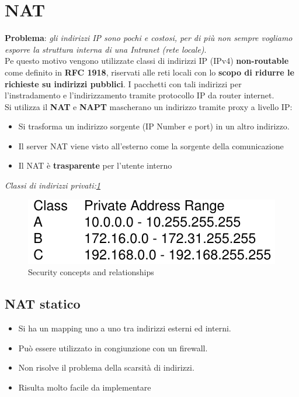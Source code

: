 \documentclass[12pt]{article}
\begin{document}
	\section{NAT}
		\textbf{Problema}: \textit{gli indirizzi IP sono pochi e costosi, per di più non sempre vogliamo esporre la struttura interna di una Intranet (rete locale)}.\\
		Pe questo motivo vengono utilizzate classi di indirizzi IP (IPv4) \textbf{non-routable} come definito in \textbf{RFC 1918}, riservati alle reti locali con lo \textbf{scopo di ridurre le richieste su indirizzi pubblici}. I pacchetti con tali indirizzi per l'instradamento e l'indirizzamento tramite protocollo IP da router internet.\\
		Si utilizza il \textbf{NAT} e \textbf{NAPT} mascherano un indirizzo tramite proxy a livello IP:
		\begin{itemize}
			\item Si trasforma un indirizzo sorgente (IP Number e port) in un altro indirizzo.
			\item Il server NAT viene visto all'esterno come la sorgente della comunicazione
			\item Il NAT è \textbf{trasparente} per l'utente interno 
		\end{itemize}
		
		\textit{Classi di indirizzi privati:\ref{fig:1}}
		\begin{figure}[h!]
			\centering
			\includegraphics[scale=0.40]{img/class.PNG}
			\caption{Security concepts and relationships\label{fig:1}}
		\end{figure}
		
		\subsection{NAT statico}
			\begin{itemize}
				\item Si ha un mapping uno a uno tra indirizzi esterni ed interni.
				\item Può essere utilizzato in congiunzione con un firewall.
				\item Non risolve il problema della scarsità di indirizzi.
				\item Risulta molto facile da implementare	
			\end{itemize}
		
\end{document}
